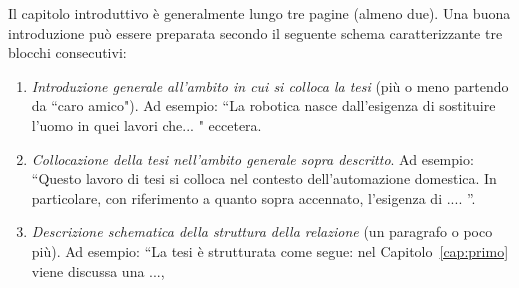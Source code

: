 Il capitolo introduttivo \`e generalmente lungo tre pagine (almeno due). 
Una buona introduzione pu\`o essere preparata secondo il seguente schema caratterizzante tre blocchi consecutivi: 
\begin{enumerate}
\item {\em Introduzione generale all'ambito in cui si colloca la tesi} (pi\`u o meno partendo da ``caro amico"). Ad esempio: ``La robotica nasce dall'esigenza di sostituire l'uomo in quei lavori che... " eccetera.

\item {\em Collocazione della tesi nell'ambito generale sopra descritto}. Ad esempio: ``Questo lavoro di tesi si colloca nel contesto dell'automazione domestica. In particolare, con riferimento a quanto sopra accennato, l'esigenza di .... ''.

\item {\em Descrizione schematica della struttura della relazione} (un paragrafo o poco pi\`u). Ad esempio: ``La tesi \`e strutturata come segue: nel Capitolo~\ref{cap:primo} viene discussa una ..., 

\end{enumerate}

